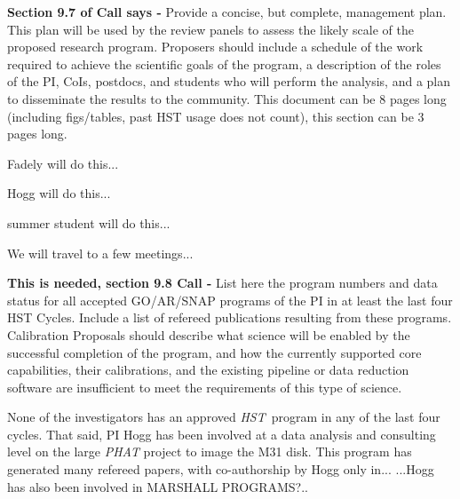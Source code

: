 \documentclass[12pt]{article}
\newcommand{\project}[1]{\textsl{#1}}
\newcommand{\HST}{\project{HST}}
\begin{document}
\textbf{Section 9.7 of Call says -} Provide a concise, but complete, 
management plan. This plan will be used by the review panels to assess 
the likely scale of the proposed research program. Proposers should 
include a schedule of the work required to achieve the scientific
goals of the program, a description of the roles of the PI, CoIs,
postdocs, and students who will perform the analysis, and a plan to 
disseminate the results to the community.  This document can be 8 
pages long (including figs/tables, past HST usage does not count),
this section can be 3 pages long.

Fadely will do this...

Hogg will do this...

summer student will do this...

We will travel to a few meetings...


%
%
%
\pasthstusage  %

\textbf{This is needed, section 9.8 Call -} List here the program 
numbers and data status for all accepted GO/AR/SNAP programs of the 
PI in at least the last four HST Cycles. Include a list of refereed 
publications resulting from these programs. Calibration Proposals 
should describe what science will be enabled by the successful 
completion of the program, and how the currently supported core 
capabilities, their calibrations, and the existing pipeline or data
reduction software are insufficient to meet the requirements of this 
type of science.


None of the investigators has an approved \HST\ program in any of the
last four cycles.  That said, PI Hogg has been involved at a data
analysis and consulting level on the large \project{PHAT} project to
image the M31 disk.  This program has generated many refereed papers,
with co-authorship by Hogg only in...  ...Hogg has also been involved
in MARSHALL PROGRAMS?..



\end{document}
